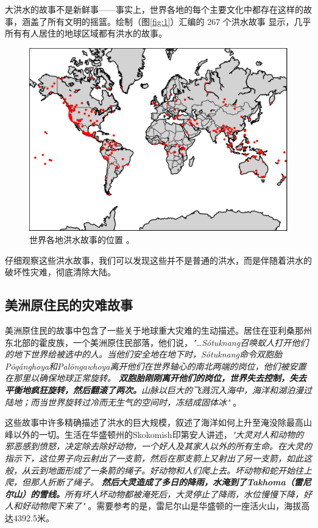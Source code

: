 \documentclass[10pt,twocolumn,letterpaper]{article}
\begin{document}
大洪水的故事不是新鲜事——事实上，世界各地的每个主要文化中都存在这样的故事，涵盖了所有文明的摇篮。绘制（图\ref{fig:1}）汇编的 267 个洪水故事 \cite{3} 显示，几乎所有有人居住的地球区域都有洪水的故事。

\begin{figure}[h]
\begin{center}
   \includegraphics[width=1\linewidth]{b.png}
\end{center}
   \caption{世界各地洪水故事的位置 \cite{3}。}
\label{fig:1}
\label{fig:onecol}
\end{figure}

仔细观察这些洪水故事，我们可以发现这些并不是普通的洪水，而是伴随着洪水的破坏性灾难，彻底清除大陆。

\subsection{美洲原住民的灾难故事}

美洲原住民的故事中包含了一些关于地球重大灾难的生动描述。居住在亚利桑那州东北部的霍皮族，一个美洲原住民部落，他们说，\textit{"…Sótuknang召唤蚁人打开他们的地下世界给被选中的人。当他们安全地在地下时，Sótuknang命令双胞胎Pöqánghoya和Palöngawhoya离开他们在世界轴心的南北两端的岗位，他们被安置在那里以确保地球正常旋转。 \textbf{双胞胎刚刚离开他们的岗位，世界失去控制，失去平衡地疯狂旋转，然后翻滚了两次。}山脉以巨大的飞溅沉入海中，海洋和湖泊漫过陆地；而当世界旋转过冷而无生气的空间时，冻结成固体冰"} \cite{4}。

这些故事中许多精确描述了洪水的巨大规模，叙述了海洋如何上升至淹没除最高山峰以外的一切。生活在华盛顿州的Skokomish印第安人讲述，\textit{"大灵对人和动物的邪恶感到愤怒，决定除去除好动物，一个好人及其家人以外的所有生命。在大灵的指示下，这位男子向云射出了一支箭，然后在那支箭上又射出了另一支箭，如此这般，从云到地面形成了一条箭的绳子。好动物和人们爬上去。坏动物和蛇开始往上爬，但那人折断了绳子。 \textbf{然后大灵造成了多日的降雨，水淹到了Takhoma（雷尼尔山）的雪线。}所有坏人坏动物都被淹死后，大灵停止了降雨，水位慢慢下降，好人和好动物爬下来了"} \cite{3}。需要参考的是，雷尼尔山是华盛顿的一座活火山，海拔高达4392.5米。
\end{document}
